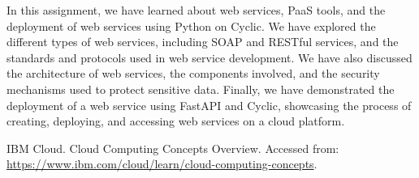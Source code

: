 \documentclass[11pt]{article}
\begin{document}
In this assignment, we have learned about web services, PaaS tools, and the deployment of web services using Python on Cyclic. We have explored the different types of web services, including SOAP and RESTful services, and the standards and protocols used in web service development. We have also discussed the architecture of web services, the components involved, and the security mechanisms used to protect sensitive data. Finally, we have demonstrated the deployment of a web service using FastAPI and Cyclic, showcasing the process of creating, deploying, and accessing web services on a cloud platform.
\clearpage

\pagebreak
\begin{thebibliography}{}

    IBM Cloud. Cloud Computing Concepts Overview. Accessed from: \url{https://www.ibm.com/cloud/learn/cloud-computing-concepts}.

\end{thebibliography}
\end{document}
